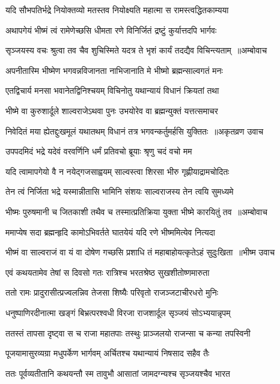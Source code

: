 \twolineshloka
{यदि सौभपतिर्भद्रे नियोक्तव्यो मतस्तव}
{नियोक्ष्यति महात्मा स रामस्त्वद्धितकाम्यया}


\twolineshloka
{अथापगेयं भीष्मं त्वं रामेणेच्छसि धीमता}
{रणे विनिर्जितं द्रष्टुं कुर्यात्तदपि भार्गवः}


\threelineshloka
{सृञ्जयस्य वचः श्रुत्वा तव चैव शुचिस्मिते}
{यदत्र ते भृशं कार्यं तदद्यैव विचिन्त्यताम् ॥अम्बोवाच}
{}


\twolineshloka
{अपनीतास्मि भीष्मेण भगवन्नविजानता}
{नाभिजानाति मे भीष्मो ब्रह्मन्साल्वगतं मनः}


\twolineshloka
{एतद्विचार्य मनसा भवानेतद्विनिश्चयम्}
{विचिनोतु यथान्यायं विधानं क्रियतां तथा}


\twolineshloka
{भीष्मे वा कुरुशार्दूले शाल्वराजेऽथवा पुनः}
{उभयोरेव वा ब्रह्मन्युक्तं यत्तत्समाचर}


\threelineshloka
{निवेदितं मया ह्येतद्दुःखमूलं यथातथम्}
{विधानं तत्र भगवन्कर्तुमर्हसि युक्तितः ॥अकृतव्रण उवाच}
{}


\twolineshloka
{उपपदमिदं भद्रे यदेवं वरवर्णिनि}
{धर्मं प्रतिवचो ब्रूयाः श्रृणु चदं वचो मम}


\twolineshloka
{यदि त्वामापगेयो वै न नयेद्गजसाह्वयम्}
{साल्वस्त्वा शिरसा भीरु गृह्णीयाद्रामचोदितः}


\twolineshloka
{तेन त्वं निर्जिता भद्रे यस्मान्नीतासि भामिनि}
{संशयः साल्वराजस्य तेन त्वयि सुमध्यमे}


\threelineshloka
{भीष्मः पुरुषमानी च जितकाशी तथैव च}
{तस्मात्प्रतिक्रिया युक्ता भीष्मे कारयितुं तव ॥अम्बोवाच}
{}


\twolineshloka
{ममाप्येष सदा ब्रह्मन्हृदि कामोऽभिवर्तते}
{घातयेयं यदि रणे भीष्ममित्येव नित्यदा}


\threelineshloka
{भीष्मं वा साल्वराजं वा यं वा दोषेण गच्छसि}
{प्रशाधि तं महाबाहोयत्कृतेऽहं सुदुःखिता ॥भीष्म उवाच}
{}


\twolineshloka
{एवं कथयतामेव तेषां स दिवसो गतः}
{रात्रिश्च भरतश्रेष्ठ सुखशीतोष्णमारुता}


\twolineshloka
{ततो रामः प्रादुरासीत्प्रज्वलन्निव तेजसा}
{शिष्यैः परिवृतो राजञ्जटाचीरधरो मुनिः}


\twolineshloka
{धनुष्पाणिरदीनात्मा खङ्गं बिभ्रत्परश्वधी}
{विरजा राजशार्दूल सृञ्जयं सोऽभ्ययान्नृपम्}


\twolineshloka
{ततस्तं तापसा दृष्ट्वा स च राजा महातपाः}
{तस्थुः प्राञ्जलयो राजन्सा च कन्या तपस्विनी}


\twolineshloka
{पूजयामासुरव्यग्रा मधुपर्केण भार्गवम्}
{अर्चितश्च यथान्यायं निषसाद सहैव तैः}


\twolineshloka
{ततः पूर्वव्यतीतानि कथयन्तौ स्म तावुभौ}
{आसातां जामदग्न्यश्च सृञ्जयश्चैव भारत}


